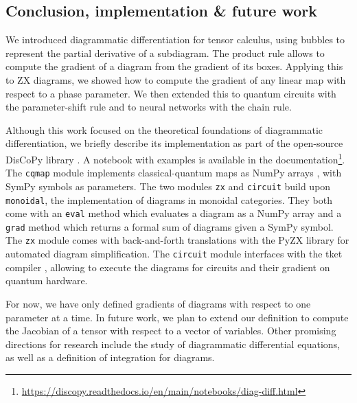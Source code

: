 
\subsection*{Conclusion, implementation \& future work}

We introduced diagrammatic differentiation for tensor calculus, using bubbles
to represent the partial derivative of a subdiagram. The product rule
allows to compute the gradient of a diagram from the gradient of its boxes.
Applying this to ZX diagrams, we showed how to compute the gradient of any linear
map with respect to a phase parameter. We then extended this to quantum circuits
with the parameter-shift rule and to neural networks with the chain rule.

Although this work focused on the theoretical foundations of diagrammatic
differentiation, we briefly describe its implementation as
part of the open-source DisCoPy library \cite{DeFeliceEtAl20}. A notebook
with examples is available in the documentation\footnote{
\href{https://discopy.readthedocs.io/en/main/notebooks/diag-diff.html}{
https://discopy.readthedocs.io/en/main/notebooks/diag-diff.html}}.
The \texttt{cqmap} module implements classical-quantum maps as NumPy arrays
\cite{VanDerWaltEtAl11}, with SymPy \cite{MeurerEtAl17} symbols as parameters.
The two modules \texttt{zx} and \texttt{circuit} build upon \texttt{monoidal},
the implementation of diagrams in monoidal categories. They both come with
an \texttt{eval} method which evaluates a diagram as a NumPy array and a
\texttt{grad} method which returns a formal sum of diagrams given a SymPy symbol.
The \texttt{zx} module comes with back-and-forth translations with the PyZX
library \cite{KissingerVanDeWetering19} for automated diagram simplification.
The \texttt{circuit} module interfaces with the tket compiler \cite{SivarajahEtAl20},
allowing to execute the diagrams for circuits and their gradient on quantum hardware.

For now, we have only defined gradients of diagrams with respect to one
parameter at a time. In future work, we plan to extend our definition to
compute the Jacobian of a tensor with respect to a vector of variables.
Other promising directions for research include the study of diagrammatic
differential equations, as well as a definition of integration for diagrams.
